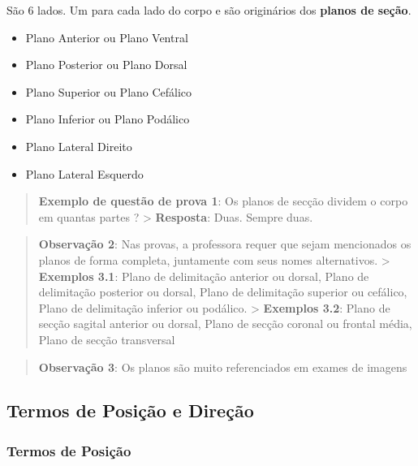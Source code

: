 \documentclass[
]{book}
\providecommand{\tightlist}{%
  \setlength{\itemsep}{0pt}\setlength{\parskip}{0pt}}
\begin{document}
São 6 lados. Um para cada lado do corpo e são originários dos \textbf{planos de seção}.

\begin{itemize}
\tightlist
\item
  Plano Anterior ou Plano Ventral
\item
  Plano Posterior ou Plano Dorsal
\item
  Plano Superior ou Plano Cefálico
\item
  Plano Inferior ou Plano Podálico
\item
  Plano Lateral Direito
\item
  Plano Lateral Esquerdo
\end{itemize}

\begin{quote}
\textbf{Exemplo de questão de prova 1}: Os planos de secção dividem o corpo em quantas partes ?
\textgreater{} \textbf{Resposta}: Duas. Sempre duas.
\end{quote}

\begin{quote}
\textbf{Observação 2}: Nas provas, a professora requer que sejam mencionados os planos de forma completa, juntamente com seus nomes alternativos.
\textgreater{} \textbf{Exemplos 3.1}: Plano de delimitação anterior ou dorsal, Plano de delimitação posterior ou dorsal, Plano de delimitação superior ou cefálico, Plano de delimitação inferior ou podálico.
\textgreater{} \textbf{Exemplos 3.2}: Plano de secção sagital anterior ou dorsal, Plano de secção coronal ou frontal média, Plano de secção transversal
\end{quote}

\begin{quote}
\textbf{Observação 3}: Os planos são muito referenciados em exames de imagens
\end{quote}

\hypertarget{termos-de-posiuxe7uxe3o-e-direuxe7uxe3o}{%
\subsection{Termos de Posição e Direção}\label{termos-de-posiuxe7uxe3o-e-direuxe7uxe3o}}

\hypertarget{termos-de-posiuxe7uxe3o}{%
\subsubsection{Termos de Posição}\label{termos-de-posiuxe7uxe3o}}
\end{document}

